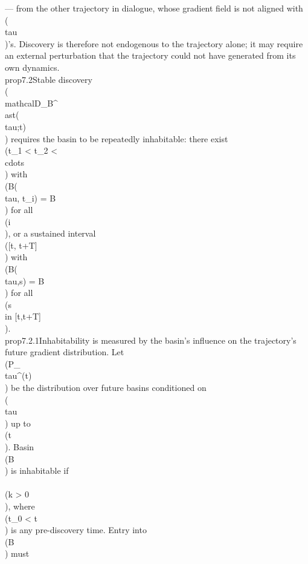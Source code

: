 {{{{{— from the other trajectory in dialogue, whose gradient field is not aligned with \\(\\tau\\)'s. Discovery is therefore not endogenous to the trajectory alone; it may require an external perturbation that the trajectory could not have generated from its own dynamics.}\n\n\\prop{7.2}{Stable discovery \\(\\mathcal{D}_B^\\ast(\\tau;t)\\) requires the basin to be repeatedly inhabitable: there exist \\(t_1 < t_2 < \\cdots\\) with \\(B(\\tau, t_i) = B\\) for all \\(i\\), or a sustained interval \\([t, t+T]\\) with \\(B(\\tau,s) = B\\) for all \\(s \\in [t,t+T]\\).}\n\n\\prop{7.2.1}{Inhabitability is measured by the basin's influence on the trajectory's future gradient distribution. Let \\(P_\\tau^{(t)}\\) be the distribution over future basins conditioned on \\(\\tau\\) up to \\(t\\). Basin \\(B\\) is inhabitable if\n\\[\nP_\\tau^{(t)}(B(\\tau,t+k)=B) > P_\\tau^{(t_0)}(B(\\tau,t_0+k)=B)\n\\]\nfor \\(k > 0\\), where \\(t_0 < t\\) is any pre-discovery time. Entry into \\(B\\) must }}}}}
